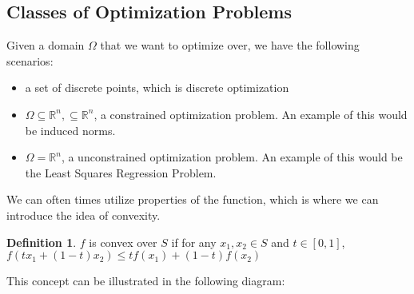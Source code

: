 \documentclass[11pt]{article}
\theoremstyle{definition}
\newtheorem{definition}{Definition}[section]
\newcommand{\R}{\mathbb{R}}
\begin{document}
\subsection{Classes of Optimization Problems}
Given a domain $\Omega$ that we want to optimize over, we have the following scenarios:
\begin{itemize}
  \item a set of discrete points, which is discrete optimization
  \item $\Omega \subseteq \R^n, \subseteq \R^n$, a constrained optimization problem. An example of this would be induced norms. 
  \item $\Omega = \R^n$, a unconstrained optimization problem. An example of this would be the Least Squares Regression Problem. 
\end{itemize}
We can often times utilize properties of the function, which is where we can introduce the idea of convexity. 
\begin{definition}
  $f$ is convex over $S$ if for any $x_1, x_2 \in S$ and $t \in [0,1]$, $f(tx_1 + (1-t)x_2) \leq tf(x_1) + (1-t)f(x_2)$
\end{definition}
This concept can be illustrated in the following diagram:
\begin{center}
\end{center}
\end{document}
